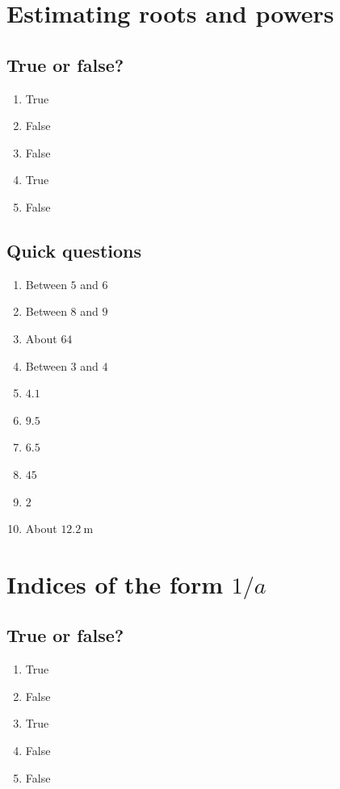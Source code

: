\documentclass[11pt]{article}
\begin{document}
\section{Estimating roots and powers}

\subsection*{True or false?}
\begin{enumerate}[label=\arabic*.]
\item True
\item False
\item False
\item True
\item False
\end{enumerate}

\subsection*{Quick questions}
\begin{enumerate}[label=\arabic*.]
\item Between \(5\) and \(6\)
\item Between \(8\) and \(9\)
\item About \(64\)
\item Between \(3\) and \(4\)
\item \(4.1\)
\item \(9.5\)
\item \(6.5\)
\item \(45\)
\item \(2\)
\item About \(12.2\ \mathrm{m}\)
\end{enumerate}

\section{Indices of the form \(1/a\)}

\subsection*{True or false?}
\begin{enumerate}[label=\arabic*.]
\item True
\item False
\item True
\item False
\item False
\end{enumerate}
\end{document}
